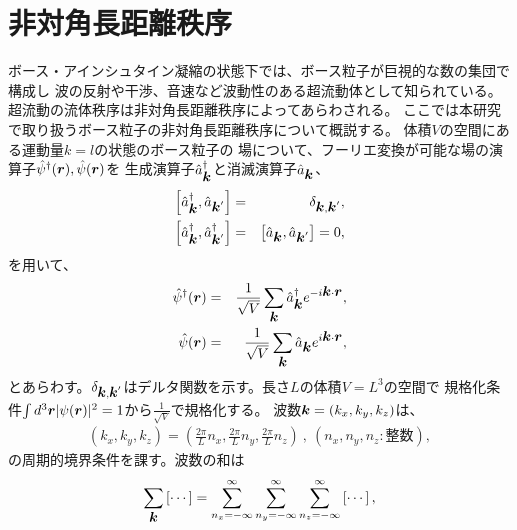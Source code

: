 \documentclass[12pt,a4paper]{jbook}
\def\Vec#1{\mbox{\boldmath $#1$}}			%
\begin{document}
		\section{非対角長距離秩序}
        ボース・アインシュタイン凝縮の状態下では、ボース粒子が巨視的な数の集団で構成し
        波の反射や干渉、音速など波動性のある超流動体として知られている。
        超流動の流体秩序は非対角長距離秩序によってあらわされる。
        ここでは本研究で取り扱うボース粒子の非対角長距離秩序について概説する。
        体積$V$の空間にある運動量$k=l$の状態のボース粒子の
        場について、フーリエ変換が可能な場の演算子$\hat{\psi}^\dagger(\Vec{r}),\hat{\psi}(\Vec{r})$を
        生成演算子$\hat{a}^\dagger_{\Vec{k}}$と消滅演算子$\hat{a}_{\Vec{k}}$、
        \begin{eqnarray}
            \left[ \hat{a}^\dagger_{\Vec{k}}, \hat{a}_{\Vec{k}^\prime} \right] & = & 
            \delta_{\Vec{k},\Vec{k}^\prime},
            \\
            \left[ \hat{a}^\dagger_{\Vec{k}}, \hat{a}^\dagger_{\Vec{k}^\prime} \right] & = & 
            \left[ \hat{a}_{\Vec{k}}, \hat{a}_{\Vec{k}^\prime} \right] = 0,
        \end{eqnarray}
        を用いて、
        \begin{eqnarray}
            \label{qe:cre_ann}
            \hat{\psi}^\dagger(\Vec{r}) & = & \frac{1}{\sqrt{V}} \sum_{\Vec{k}} \hat{a}^\dagger_{\Vec{k}} e^{-i \Vec{k} \cdot \Vec{r}},
            \\
            \hat{\psi}(\Vec{r}) & = & \frac{1}{\sqrt{V}} \sum_{\Vec{k}} \hat{a}_{\Vec{k}} e^{i \Vec{k} \cdot \Vec{r}},
        \end{eqnarray}
        とあらわす。$\delta_{\Vec{k},\Vec{k}^\prime}$はデルタ関数を示す。長さ$L$の体積$V=L^3$の空間で
        規格化条件$\int d^3 \Vec{r} | \psi(\Vec{r})|^2 = 1$から$\frac{1}{\sqrt{V}}$で規格化する。
        波数$\Vec{k}=(k_x, k_y, k_z)$は、
        \begin{eqnarray}
            (k_x, k_y, k_z) = \left(
                \frac{2 \pi}{L}n_x, \frac{2 \pi}{L}n_y, \frac{2 \pi}{L}n_z
            \right)
            \ , \
            (n_x, n_y, n_z : 整数),
        \end{eqnarray}
        の周期的境界条件を課す。波数の和は
        \begin{eqnarray}
            \sum_{\Vec{k}} \left[ \cdots \right] 
            = \sum^{\infty}_{n_x = -\infty} \sum^{\infty}_{n_y = -\infty} \sum^{\infty}_{n_z = -\infty} \left[ \cdots \right],
        \end{eqnarray}
\end{document}
